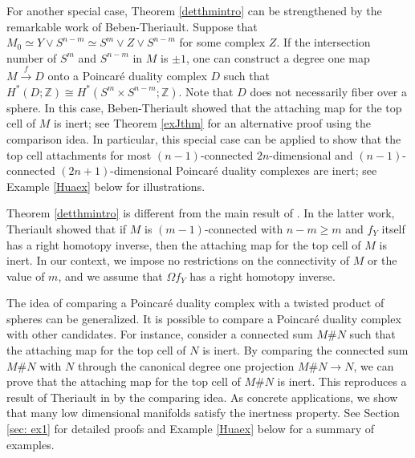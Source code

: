 \documentclass[a4]{amsart}
\theoremstyle{definition}
\begin{document}
\begin{sloppypar}
For another special case, Theorem \ref{detthmintro} can be strengthened by the remarkable work \cite{BT14} of Beben-Theriault. 
Suppose that $M_0\simeq Y\vee S^{n-m}\simeq S^m\vee Z\vee S^{n-m}$ for some complex $Z$. If the intersection number of $S^m$ and $S^{n-m}$ in $M$ is $\pm 1$, one can construct a degree one map $M\stackrel{f}{\longrightarrow} D$ onto a Poincar\'{e} duality complex $D$ such that $H^\ast(D;\mathbb{Z})\cong H^\ast(S^m\times S^{n-m};\mathbb{Z})$. Note that $D$ does not necessarily fiber over a sphere. 
In this case, Beben-Theriault \cite{BT14} showed that the attaching map for the top cell of $M$ is inert; see Theorem \ref{exJthm} for an alternative proof using the comparison idea. In particular, this special case can be applied to show that the top cell attachments for most $(n-1)$-connected $2n$-dimensional and $(n-1)$-connected $(2n+1)$-dimensional Poincar\'{e} duality complexes are inert; see Example \ref{Huaex} below for illustrations. 

Theorem \ref{detthmintro} is different from the main result of \cite{The24b}. 
In the latter work, Theriault showed that if $M$ is $(m-1)$-connected with $n-m\geq m$ and $f_Y$ itself has a right homotopy inverse, then the attaching map for the top cell of $M$ is inert. In our context, we impose no restrictions on the connectivity of $M$ or the value of $m$, and we assume that $\Omega f_Y$ has a right homotopy inverse.   

The idea of comparing a Poincar\'{e} duality complex with a twisted product of spheres can be generalized. It is possible to compare a Poincar\'{e} duality complex with other candidates. For instance, consider a connected sum $M\#N$ such that the attaching map for the top cell of $N$ is inert. By comparing the connected sum $M\#N$ with $N$ through the canonical degree one projection $M\#N\stackrel{}{\longrightarrow} N$, we can prove that the attaching map for the top cell of $M\#N$ is inert. This reproduces a result of Theriault in \cite{The24a} by the comparing idea. As concrete applications, we show that many low dimensional manifolds satisfy the inertness property. See Section \ref{sec: ex1} for detailed proofs and Example \ref{Huaex} below for a summary of examples. 



$\, $


\end{sloppypar}
\end{document}

